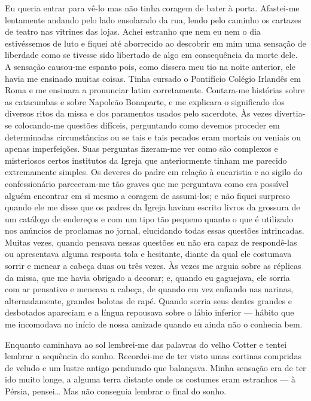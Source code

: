 Eu queria entrar para vê-lo mas não tinha coragem de bater à porta.  Afastei-me
lentamente andando pelo lado ensolarado da rua, lendo pelo caminho os cartazes
de teatro nas vitrines das lojas.  Achei estranho que nem eu nem o dia
estivéssemos de luto e fiquei até aborrecido ao descobrir em mim uma sensação
de liberdade como se tivesse sido libertado de algo em consequência da morte
dele.  A sensação causou-me espanto pois, como dissera meu tio na noite
anterior, ele havia me ensinado muitas coisas.  Tinha cursado o Pontifício
Colégio Irlandês em Roma e me ensinara a pronunciar latim corretamente.
Contara-me histórias sobre as catacumbas e sobre Napoleão Bonaparte, e me
explicara o significado dos diversos ritos da missa e dos paramentos usados
pelo sacerdote.  Às vezes divertia-se colocando-me questões difíceis,
perguntando como devemos proceder em determinadas circunstâncias ou se tais e
tais pecados eram mortais ou veniais ou apenas imperfeições.  Suas perguntas
fizeram-me ver como são complexos e misteriosos certos institutos da Igreja que
anteriormente tinham me parecido extremamente simples.  Os deveres do padre em
relação à eucaristia e ao sigilo do confessionário pareceram-me tão graves que
me perguntava como era possível alguém encontrar em si mesmo a coragem de
assumi-los; e não fiquei surpreso quando ele me disse que os padres da Igreja
haviam escrito livros da grossura de um catálogo de endereços e com um tipo tão
pequeno quanto o que é utilizado nos anúncios de proclamas no jornal,
elucidando todas essas questões intrincadas.  Muitas vezes, quando pensava
nessas questões eu não era capaz de respondê-las ou apresentava alguma resposta
tola e hesitante, diante da qual ele costumava sorrir e menear a cabeça duas ou
três vezes.  Às vezes me arguia sobre as réplicas da missa, que me havia
obrigado a decorar; e, quando eu gaguejava, ele sorria com ar pensativo e
meneava a cabeça, de quando em vez enfiando nas narinas, alternadamente,
grandes bolotas de rapé.  Quando sorria seus dentes grandes e desbotados
apareciam e a língua repousava sobre o lábio inferior --- hábito que me
incomodava no início de nossa amizade quando eu ainda não o conhecia bem.

Enquanto caminhava ao sol lembrei-me das palavras do velho Cotter e tentei
lembrar a sequência do sonho.  Recordei-me de ter visto umas cortinas compridas
de veludo e um lustre antigo pendurado que balançava.  Minha sensação era de
ter ido muito longe, a alguma terra distante onde os costumes eram estranhos
--- à Pérsia, pensei\ldots{}  Mas não conseguia lembrar o final do sonho.

